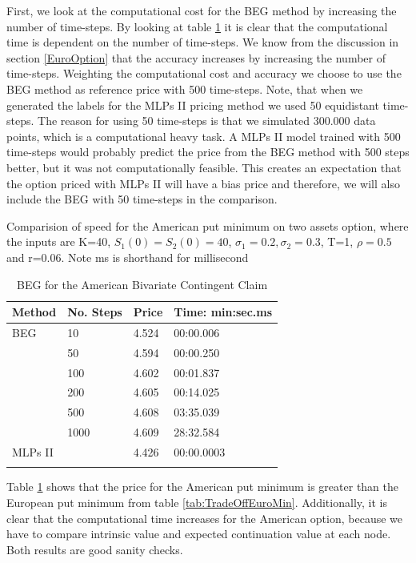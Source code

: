 First, we look at the computational cost for the BEG method by increasing the number of time-steps. By looking at table \ref{tab:TradeOffAmerMin} it is clear that the computational time is dependent on the number of time-steps. We know from the discussion in section \ref{EuroOption} that the accuracy increases by increasing the number of time-steps. Weighting the computational cost and accuracy we choose to use the BEG method as reference price with 500 time-steps. Note, that when we generated the labels for the MLPs II pricing method we used 50 equidistant time-steps. The reason for using 50 time-steps is that we simulated 300.000 data points, which is a computational heavy task. A MLPs II model trained with 500 time-steps would probably predict the price from the BEG method with 500 steps better, but it was not computationally feasible. This creates an expectation that the option priced with MLPs II will have a bias price and therefore, we will also include the BEG with 50 time-steps in the comparison.\\

\begin{table}[th]
\caption{BEG for the American Bivariate Contingent Claim}{Comparision of speed for the American put minimum on two assets option, where the inputs are K=40, $S_1(0)=S_2(0)=40$, $\sigma_1=0.2, \sigma_2=0.3$, T=1, $\rho=0.5$  and r=0.06. Note ms is shorthand for millisecond}
\label{tab:TradeOffAmerMin}
\centering
\begin{tabular}{l l l l}
\toprule
\textbf{Method} & \textbf{No. Steps} & \textbf{Price} & \textbf{Time: min:sec.ms} \\
\midrule
BEG & 10 & 4.524 & 00:00.006\\
& 50 & 4.594 & 00:00.250\\
& 100 & 4.602 & 00:01.837\\
& 200 & 4.605 & 00:14.025\\
& 500 & 4.608 & 03:35.039\\
& 1000 & 4.609 & 28:32.584\\
MLPs II &  & 4.426 & 00:00.0003\\
\bottomrule\\
\end{tabular}
\end{table}

Table \ref{tab:TradeOffAmerMin} shows that the price for the American put minimum is greater than the European put minimum from table \ref{tab:TradeOffEuroMin}. Additionally, it is clear that the computational time increases for the American option, because we have to compare intrinsic value and expected continuation value at each node. Both results are good sanity checks.\\

